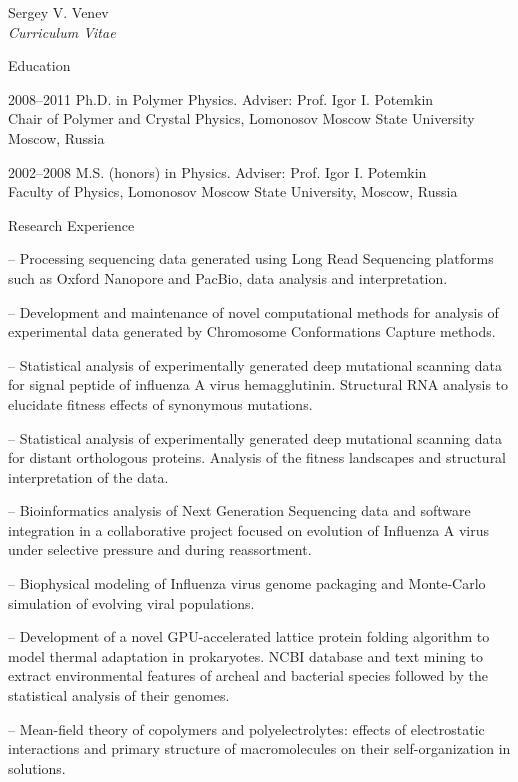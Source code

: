 \documentclass[10pt]{article}
\begin{document}
\begin{cv}{Sergey V. Venev\\{\large \itshape Curriculum Vitae}}
\begin{cvlist}{Education}
    \item[2008--2011] Ph.D. in Polymer Physics. Adviser: Prof. Igor I. Potemkin\\
    Chair of Polymer and Crystal Physics, Lomonosov Moscow State University\\
    Moscow, Russia  
    \item[2002--2008] M.S. (honors) in Physics. Adviser: Prof. Igor I. Potemkin\\
    Faculty of Physics, Lomonosov Moscow State University,
    Moscow, Russia  
\end{cvlist}




\setlength{\oldcvlabelwidth}{\cvlabelwidth}
\setlength{\cvlabelwidth}{1em}
\begin{cvlist}{Research Experience}
    \item[--] Processing sequencing data generated using Long Read Sequencing platforms such as Oxford Nanopore and PacBio, data analysis and interpretation.
    \item[--] Development and maintenance of novel computational methods for analysis of experimental data generated by Chromosome Conformations Capture methods.
    \item[--] Statistical analysis of experimentally generated deep mutational scanning data for signal peptide of influenza A virus hemagglutinin. Structural RNA analysis to elucidate fitness effects of synonymous mutations.
    \item[--] Statistical analysis of experimentally generated deep mutational scanning data for distant orthologous proteins. Analysis of the fitness landscapes and structural interpretation of the data.
    \item[--] Bioinformatics analysis of Next Generation Sequencing data and software integration in a collaborative project focused on evolution of Influenza A virus under selective pressure and during reassortment.
    \item[--] Biophysical modeling of Influenza virus genome packaging and Monte-Carlo simulation of evolving viral populations.
    \item[--] Development of a novel GPU-accelerated lattice protein folding algorithm to model thermal adaptation in prokaryotes. NCBI database and text mining to extract environmental features of archeal and bacterial species followed by the statistical analysis of their genomes.
    \item[--] Mean-field theory of copolymers and polyelectrolytes: effects of electrostatic interactions and primary structure of macromolecules on their self-organization in solutions.


\end{cvlist}
\end{cv}
\end{document}
